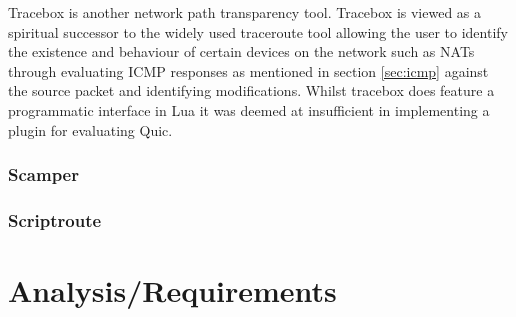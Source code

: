 \documentclass{l4proj}
\begin{document}
Tracebox is another network path transparency tool. Tracebox is viewed as a spiritual successor to the widely used traceroute tool allowing the user to identify the existence and behaviour of certain devices on the network such as NATs through evaluating ICMP responses as mentioned in section \ref{sec:icmp} against the source packet and identifying modifications. Whilst tracebox does feature a programmatic interface in Lua it was deemed at insufficient in implementing a plugin for evaluating Quic. 

\subsection{Scamper}


\subsection{Scriptroute}












\chapter{Analysis/Requirements}
\end{document}
